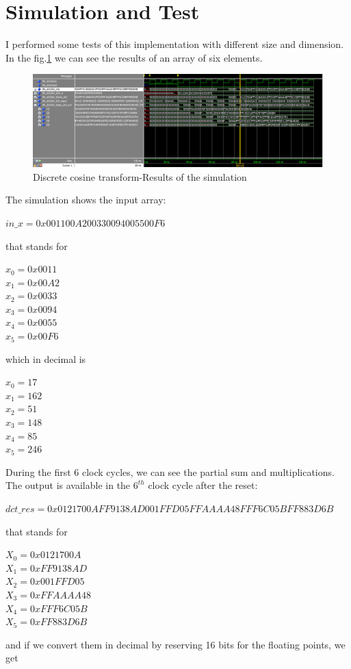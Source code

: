 \section{Simulation and Test} 
I performed some tests of this implementation with different size and dimension. In the fig.\ref{fig:tb_dct} we can see the results of an array of six elements.

\begin{figure}[h!]
	\centering	
	\includegraphics[width=\textwidth]{imm/dct/wave1.png}  
	\caption{Discrete cosine transform-Results of the simulation} 
	\label{fig:tb_dct}
\end{figure}
The simulation shows the input array:
\begin{center}
	$ in\_x=0x001100A200330094005500F6$ 
\end{center}
that stands for 
\begin{center}
	$ x_{0}=0x0011$\\
$ 	x_{1}=0x00A2 $\\
	$ x_{2}=0x0033 $ \\
	$ x_{3}=0x0094 $ \\
	$ x_{4}=0x0055 $ \\
	$x_{5}=0x00F6$
\end{center} which in decimal is
\begin{center}

$ x_{0}=17$ \\$ x_{1}=162 $\\$ x_{2}=51 $\\$ x_{3}=148 $\\$ x_{4}=85 $\\$x_{5}=246$
\end{center}
During the first 6 clock cycles, we can see the partial sum and multiplications.
The output is available in the $ 6^{th} $ clock cycle after the reset:\begin{center}
	 $ dct\_res=0x0121700AFF9138AD001FFD05FFAAAA48FFF6C05BFF883D6B $
\end{center} that stands for\begin{center}
 $ X_{0}=0x0121700A$ \\$X_{1}=0xFF9138AD$\\$X_{2}=0x001FFD05$\\$X_{3}=0xFFAAAA48
 $\\$X_{4}=0xFFF6C05B$\\$X_{5}=0xFF883D6B $
\end{center} and if we convert them in decimal by reserving 16 bits for the floating points, we get 
